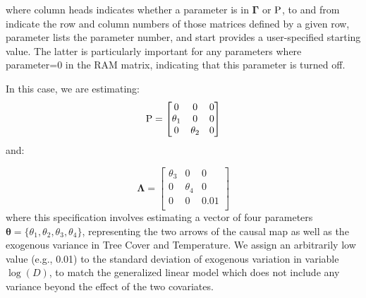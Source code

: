 %
\lstset{style=Routput}

where column \colorbox{backcolour}{heads} indicates whether a parameter is in \(\mathbf{\Gamma}\) or \(\mathbf{\operatorname{P}}\), \colorbox{backcolour}{to} and \colorbox{backcolour}{from} indicate the row and column numbers of those matrices defined by a given row, \colorbox{backcolour}{parameter} lists the parameter number, and \colorbox{backcolour}{start} provides a user-specified starting value.  The latter is particularly important for any parameters where \colorbox{backcolour}{parameter=0} in the RAM matrix, indicating that this parameter is turned off.  

In this case, we are estimating:
\begin{equation} \label{eq:Chap7_RAM}
    \mathbf{\Rho} = \begin{bmatrix}
    0 & 0 & 0 \\
    \theta_1 & 0 & 0 \\
    0 & \theta_2 & 0 \\
    \end{bmatrix} 
\end{equation}
and:

\begin{equation} 
    \mathbf{\Lambda} = \begin{bmatrix}
    \theta_3 & 0 & 0 \\
    0 & \theta_4 & 0 \\
    0 & 0 & 0.01 \\
    \end{bmatrix} 
\end{equation}
where this specification involves estimating a vector of four parameters \( \mathbf{\theta} = \{ \theta_1, \theta_2, \theta_3, \theta_4\} \), representing the two arrows of the causal map as well as the exogenous variance in Tree Cover and Temperature. We assign an arbitrarily low value (e.g., 0.01) to the standard deviation of exogenous variation in variable \(\log(D)\), to match the generalized linear model which does not include any variance beyond the effect of the two covariates.  

